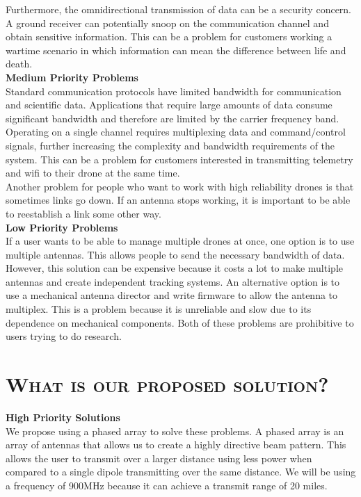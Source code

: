 \documentclass[11pt]{article}
\numberwithin{figure}{section}
\begin{document}
	Furthermore, the omnidirectional transmission of data can be a security concern.  A ground receiver can potentially snoop on the communication channel and obtain sensitive information.  This can be a problem for customers working a wartime scenario in which information can mean the difference between life and death.  \\

	\textbf{Medium Priority Problems} \\
	Standard communication protocols have limited bandwidth for communication and scientific data.  Applications that require large amounts of data consume significant bandwidth and therefore are limited by the carrier frequency band.  Operating on a single channel requires multiplexing data and command/control signals, further increasing the complexity and bandwidth requirements of the system.  This can be a problem for customers interested in transmitting telemetry and wifi to their drone at the same time.  \\
	
	Another problem for people who want to work with high reliability drones is that sometimes links go down.  If an antenna stops working, it is important to be able to reestablish a link some other way.  \\
	
	\textbf{Low Priority Problems} \\
	If a user wants to be able to manage multiple drones at once, one option is to use multiple antennas.  This allows people to send the necessary bandwidth of data.  However, this solution can be expensive because it costs a lot to make multiple antennas and create independent tracking systems.  An alternative option is to use a mechanical antenna director and write firmware to allow the antenna to multiplex.  This is a problem because it is unreliable and slow due to its dependence on mechanical components.  Both of these problems are prohibitive to users trying to do research.
	

	
\section{\textsc{What is our proposed solution?}}
	\textbf{High Priority Solutions}  \\
	We propose using a phased array to solve these problems.  A phased array is an array of antennas that allows us to create a highly directive beam pattern.  This allows the user to transmit over a larger distance using less power when compared to a single dipole transmitting over the same distance.  We will be using a frequency of 900MHz because it can achieve a transmit range of 20 miles.  \\
	
\end{document}
